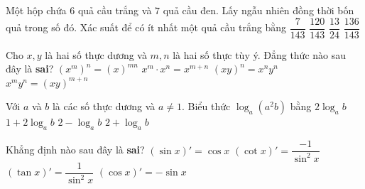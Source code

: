 \begin{ex}%
	Một hộp chứa $6$ quả cầu trắng và $7$ quả cầu đen. Lấy ngẫu nhiên đồng thời bốn quả trong số đó. Xác suất để có ít nhất một quả cầu trắng bằng
	\choice
	{$\dfrac{7}{143}$}
	{$\dfrac{120}{143}$}
	{$\dfrac{13}{24}$}
	{\True $\dfrac{136}{143}$}
\end{ex}

\begin{ex}%
	Cho $x, y$ là hai số thực dương và $m, n$ là hai số thực tùy ý. Đẳng thức nào sau đây là {\bfseries sai}?
	\choice
	{$\left(x^{m}\right)^{n}=(x)^{m n}$}
	{$x^{m}\cdot x^{n}=x^{m+n}$}
	{$(x y)^{n}=x^{n}y^{n}$}
	{\True$x^{m}y^{n}=(x y)^{m+n}$}
\end{ex}

\begin{ex}%
	Với $a$ và $b$ là các số thực dương và $a \neq 1$. Biểu thức $\log _{a}\left(a^2 b\right)$ bằng
	\choice
	{$2 \log _{a}b$}
	{$1+2 \log _{a}b$}
	{$2-\log _{a}b$}
	{\True $2+\log _{a}b$}
\end{ex}

\begin{ex}%
	Khẳng định nào sau đây là \textbf{sai}?
	\choice
	{$(\sin x)'=\cos x$}
	{$(\cot x)'=\dfrac{-1}{\sin^2x}$}
	{\True $(\tan x)'=\dfrac{1}{\sin^2x}$}
	{$(\cos x)'=-\sin x$}
\end{ex}

